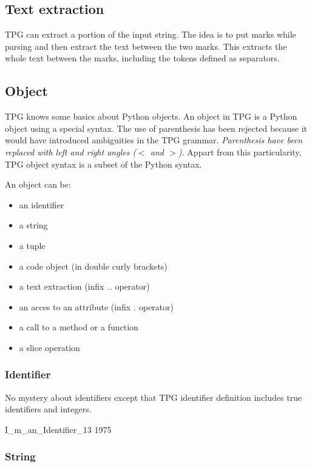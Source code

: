 \subsection{Text extraction}									\label{parser:mark}

TPG can extract a portion of the input string.
The idea is to put marks while parsing and then extract the text between the two marks.
This extracts the whole text between the marks, including the tokens defined as separators.

\subsection{Object}												\label{parser:object}

TPG knows some basics about Python objects.
An object in TPG is a Python object using a special syntax.
The use of parenthesis has been rejected because it would have introduced ambiguities in the TPG grammar.
\emph{Parenthesis have been replaced with left and right angles (\emph{$<$} and \emph{$>$}).}
Appart from this particularity, TPG object syntax is a subset of the Python syntax.

An object can be:
\begin{itemize}
	\item an identifier
	\item a string
	\item a tuple
	\item a code object (in double curly brackets)
	\item a text extraction (infix \emph{..} operator)
	\item an acces to an attribute (infix \emph{.} operator)
	\item a call to a method or a function
	\item a slice operation
\end{itemize}

\subsubsection{Identifier}

No mystery about identifiers except that TPG identifier definition includes true identifiers and integers.

\begin{verbatimtab}[4]
	I_m_an_Identifier_13
	1975
\end{verbatimtab}

\subsubsection{String}

